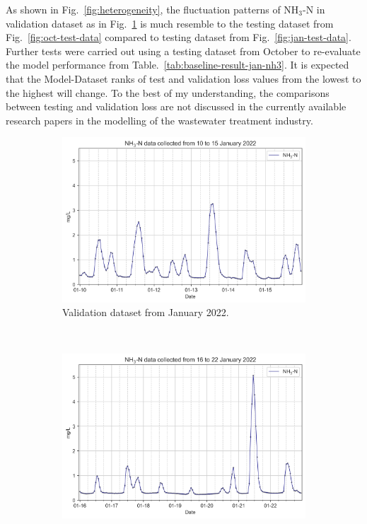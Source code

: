 As shown in Fig.~\ref{fig:heterogeneity}, the fluctuation patterns of NH$_{3}$-N in validation dataset as in Fig.~\ref{fig:valid-data} is much resemble to the testing dataset from Fig.~\ref{fig:oct-test-data} compared to testing dataset from Fig.~\ref{fig:jan-test-data}. Further tests were carried out using a testing dataset from October to re-evaluate the model performance from Table.~\ref{tab:baseline-result-jan-nh3}. It is expected that the Model-Dataset ranks of test and validation loss values from the lowest to the highest will change. To the best of my understanding, the comparisons between testing and validation loss are not discussed in the currently available research papers in the modelling of the wastewater treatment industry.

\begin{figure}[!ht]
  \centering
  \begin{subfigure}[t]{0.45\textwidth}
    \includegraphics[width=\linewidth]{imgs/results/heterogeneity-validation.png}
    \caption{Validation dataset from January 2022.} \label{fig:valid-data}
  \end{subfigure}\\
  \begin{subfigure}[t]{0.45\textwidth}
    \includegraphics[width=\linewidth]{imgs/results/heterogeneity-jan-test.png}

\end{subfigure}
\end{figure}

